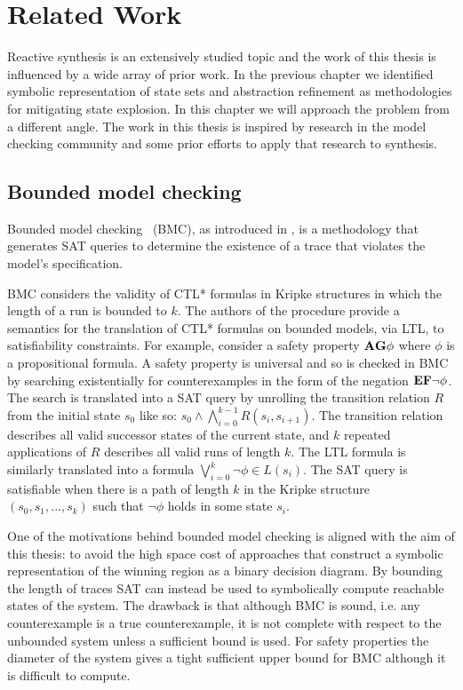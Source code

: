 \chapter{Related Work}
\label{ch:relatedwork}

Reactive synthesis is an extensively studied topic and the work of this thesis is influenced by a wide array of prior work. In the previous chapter we identified symbolic representation of state sets and abstraction refinement as methodologies for mitigating state explosion. In this chapter we will approach the problem from a different angle. The work in this thesis is inspired by research in the model checking community and some prior efforts to apply that research to synthesis.

\section{Bounded model checking}

Bounded model checking~\cite{Biere99} (BMC), as introduced in , is a methodology that generates SAT queries to determine the existence of a trace that violates the model's specification. 

BMC considers the validity of CTL* formulas in Kripke structures in which the length of a run is bounded to $k$. The authors of the procedure provide a semantics for the translation of CTL* formulas on bounded models, via LTL, to satisfiability constraints. For example, consider a safety property $\textbf{A}\textbf{G} \phi$ where $\phi$ is a propositional formula. A safety property is universal and so is checked in BMC by searching existentially for counterexamples in the form of the negation $\textbf{E}\textbf{F} \lnot \phi$. The search is translated into a SAT query by unrolling the transition relation $R$ from the initial state $s_0$ like so: $s_0 \land \bigwedge_{i=0}^{k-1} R(s_i, s_{i+1})$. The transition relation describes all valid successor states of the current state, and $k$ repeated applications of $R$ describes all valid runs of length $k$.  The LTL formula is similarly translated into a formula $\bigvee_{i=0}^{k} \lnot \phi \in L(s_i)$. The SAT query is satisfiable when there is a path of length $k$ in the Kripke structure $(s_0, s_1, ..., s_k)$ such that $\lnot \phi$ holds in some state $s_i$.

One of the motivations behind bounded model checking is aligned with the aim of this thesis: to avoid the high space cost of approaches that construct a symbolic representation of the winning region as a binary decision diagram. By bounding the length of traces SAT can instead be used to symbolically compute reachable states of the system. The drawback is that although BMC is sound, i.e. any counterexample is a true counterexample, it is not complete with respect to the unbounded system unless a sufficient bound is used. For safety properties the diameter of the system gives a tight sufficient upper bound for BMC although it is difficult to compute.

